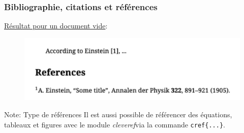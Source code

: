 \begin{frame}[fragile]
    \frametitle{Bibliographie, citations et références}
    \underline{Résultat pour un document vide}:
    \vfill
    \begin{figure}
        \centering
        \includegraphics[width=0.65\linewidth]{./figures/biblatex.png}
        \label{fig: biblatex}
    \end{figure}
    \vfill\pause
    \begin{noteblock}{Note: Type de références}
        Il est aussi possible de référencer des équations, tableaux et figures avec le module \textcolor{hard_green}{\textit{cleveref}}\footnotemark via la commande \texttt{cref\{...\}}.
    \end{noteblock}
\end{frame}
